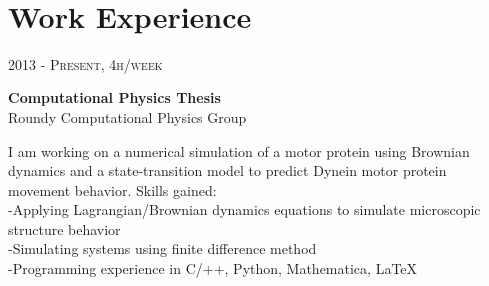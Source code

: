 \documentclass[10pt]{article} %
\begin{document}
\color{text1} %


\par{\\%
  \vspace{10pt} %
	

\begin{minipage}[t]{0.5\textwidth} %
\vspace{0pt} %
	

\section{Work Experience} 


{\raggedleft\textsc{2013 - Present, 4h/week}\par}

{\raggedright\large \textbf{Computational Physics Thesis}\\
{Roundy Computational Physics Group}\\[5pt]}
\normalsize{I am working on a numerical simulation of a motor protein using Brownian dynamics and a state-transition model to predict Dynein motor protein movement behavior. Skills gained:}\\
\hspace*{0.2in}-Applying Lagrangian/Brownian dynamics equations to simulate microscopic structure behavior\\
\hspace*{0.2in}-Simulating systems using finite difference method\\
\hspace*{0.2in}-Programming experience in C/++, Python, Mathematica, LaTeX\\


\end{minipage}}
\end{document}
